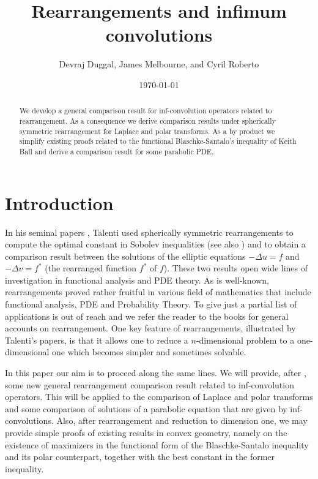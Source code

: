 \documentclass[11pt]{article}
\date{\vspace{-5ex}}
\date{\today}
\newcommand{\1}{[1]}
\begin{document}
\title{Rearrangements and infimum convolutions}
\author{Devraj Duggal, James Melbourne, and Cyril Roberto}
\maketitle
\begin{abstract}
We develop a general comparison result for inf-convolution operators related to rearrangement. As a consequence we derive comparison results under spherically symmetric rearrangement for Laplace and polar transforms. As a by product we simplify existing proofs related to the functional Blaschke-Santalo's inequality of Keith Ball and derive a comparison result for some parabolic PDE.
\end{abstract}





\section{Introduction}

In his seminal papers \cite{talenti,talenti76}, Talenti used spherically symmetric rearrangements to compute the optimal constant in  Sobolev inequalities (see also \cite{aubin}) and to obtain a comparison result between the solutions of the elliptic equations $-\Delta u=f$ and $-\Delta v=f^*$ (the rearranged function $f^*$ of $f$). 
These two results open wide lines of investigation in functional analysis and PDE theory. 
%
As is well-known, rearrangements proved rather fruitful in various field of mathematics that include functional analysis, PDE and Probability Theory. To give just a partial list of applications is out of reach and we refer the reader to the books \cite{lieb-loss,baerstein,leoni} for general accounts on rearrangement.
%
One key feature of rearrangements, illustrated by Talenti's papers, is that it allows one to reduce a $n$-dimensional problem to a one-dimensional one which becomes simpler and sometimes solvable.

\medskip

In this paper our aim is to proceed along the same lines. We will provide, after \cite{melbourne2019rearrangement}, some new general rearrangement comparison result related to inf-convolution operators. This will be applied to the comparison of Laplace and polar transforms and some comparison of solutions of a parabolic equation that are given by inf-convolutions. Also, after rearrangement and reduction to dimension one,  we may provide simple proofs of existing results in convex geometry, namely on the existence of maximizers in the functional form of the Blaschke-Santalo inequality and its polar counterpart, together with the best constant in the former inequality.
\end{document}
